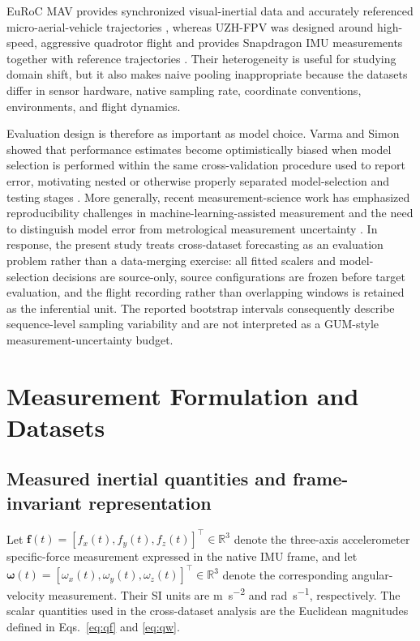 \documentclass[preprint,12pt]{elsarticle}
\newcommand{\vect}[1]{\boldsymbol{#1}}
\begin{document}
EuRoC MAV provides synchronized visual-inertial data and accurately referenced micro-aerial-vehicle trajectories \cite{Burri2016EuRoC}, whereas UZH-FPV was designed around high-speed, aggressive quadrotor flight and provides Snapdragon IMU measurements together with reference trajectories \cite{Delmerico2019UZHFPV}. Their heterogeneity is useful for studying domain shift, but it also makes naive pooling inappropriate because the datasets differ in sensor hardware, native sampling rate, coordinate conventions, environments, and flight dynamics.

Evaluation design is therefore as important as model choice. Varma and Simon showed that performance estimates become optimistically biased when model selection is performed within the same cross-validation procedure used to report error, motivating nested or otherwise properly separated model-selection and testing stages \cite{Varma2006CVBias}. More generally, recent measurement-science work has emphasized reproducibility challenges in machine-learning-assisted measurement \cite{Benoit2025Reproducibility} and the need to distinguish model error from metrological measurement uncertainty \cite{Huber2025ModelError}. In response, the present study treats cross-dataset forecasting as an evaluation problem rather than a data-merging exercise: all fitted scalers and model-selection decisions are source-only, source configurations are frozen before target evaluation, and the flight recording rather than overlapping windows is retained as the inferential unit. The reported bootstrap intervals consequently describe sequence-level sampling variability and are not interpreted as a GUM-style measurement-uncertainty budget.


\section{Measurement Formulation and Datasets}
\label{sec:measurement}

\subsection{Measured inertial quantities and frame-invariant representation}

Let $\vect{f}(t)=[f_x(t),f_y(t),f_z(t)]^\top\in\mathbb{R}^3$ denote the three-axis accelerometer specific-force measurement expressed in the native IMU frame, and let $\vect{\omega}(t)=[\omega_x(t),\omega_y(t),\omega_z(t)]^\top\in\mathbb{R}^3$ denote the corresponding angular-velocity measurement. Their SI units are \si{\metre\per\second\squared} and \si{\radian\per\second}, respectively. The scalar quantities used in the cross-dataset analysis are the Euclidean magnitudes defined in Eqs.~\eqref{eq:qf} and \eqref{eq:qw}.
\end{document}
